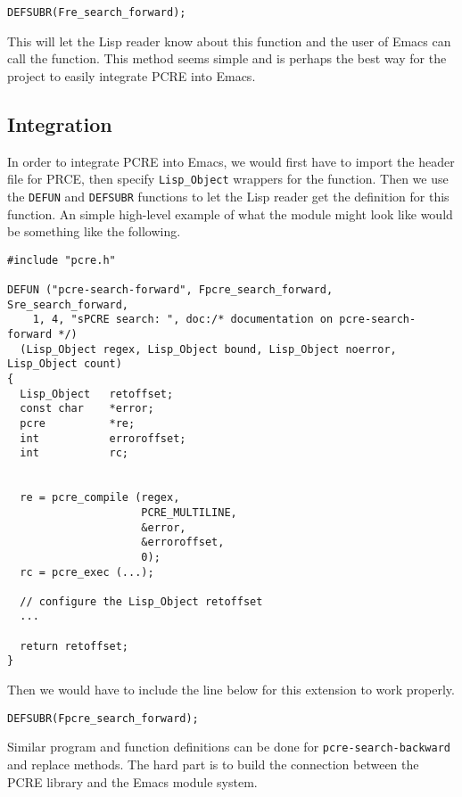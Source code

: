 \documentclass[12pt]{article}
\begin{document}
\begin{verbatim}
DEFSUBR(Fre_search_forward);
\end{verbatim}

This will let the Lisp reader know about this function and the user of Emacs can call the function. This method seems simple and is perhaps the best way for the project to easily integrate PCRE into Emacs.



\subsection{Integration}

In order to integrate PCRE into Emacs, we would first have to import the header file for PRCE, then specify \texttt{Lisp\_Object} wrappers for the function. Then we use the \texttt{DEFUN} and \texttt{DEFSUBR} functions to let the Lisp reader get the definition for this function. An simple high-level example of what the module might look like would be something like the following.

\begin{verbatim}
#include "pcre.h"

DEFUN ("pcre-search-forward", Fpcre_search_forward, Sre_search_forward,
    1, 4, "sPCRE search: ", doc:/* documentation on pcre-search-forward */)
  (Lisp_Object regex, Lisp_Object bound, Lisp_Object noerror, Lisp_Object count)
{
  Lisp_Object   retoffset;
  const char    *error;
  pcre          *re;
  int           erroroffset;
  int           rc;


  re = pcre_compile (regex,
                     PCRE_MULTILINE,
                     &error,
                     &erroroffset,
                     0);
  rc = pcre_exec (...);

  // configure the Lisp_Object retoffset
  ...

  return retoffset;
}
\end{verbatim}

Then we would have to include the line below for this extension to work properly.

\begin{verbatim}
DEFSUBR(Fpcre_search_forward);
\end{verbatim}

Similar program and function definitions can be done for \texttt{pcre-search-backward} and replace methods. The hard part is to build the connection between the PCRE library and the Emacs module system.
\end{document}
